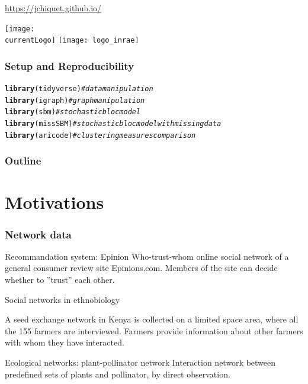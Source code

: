 \documentclass{beamer}\usepackage[]{graphicx}\usepackage[]{color}
\title{\currentCourse}
\subtitle{\huge\currentChapter\normalsize}
\institute{\currentInstitute}
\date{\currentDate}
\makeatletter
\newcommand{\hlcom}[1]{\textcolor[rgb]{0.678,0.584,0.686}{\textit{#1}}}%
\newcommand{\hlstd}[1]{\textcolor[rgb]{0.345,0.345,0.345}{#1}}%
\newcommand{\hlkwd}[1]{\textcolor[rgb]{0.737,0.353,0.396}{\textbf{#1}}}%
\newenvironment{kframe}{%
 \def\at@end@of@kframe{}%
 \ifinner\ifhmode%
  \def\at@end@of@kframe{\end{minipage}}%
  \begin{minipage}{\columnwidth}%
 \fi\fi%
 \def\FrameCommand##1{\hskip\@totalleftmargin \hskip-\fboxsep
 \colorbox{shadecolor}{##1}\hskip-\fboxsep
     \hskip-\linewidth \hskip-\@totalleftmargin \hskip\columnwidth}%
 \MakeFramed {\advance\hsize-\width
   \@totalleftmargin\z@ \linewidth\hsize
   \@setminipage}}%
 {\par\unskip\endMakeFramed%
 \at@end@of@kframe}
\newenvironment{knitrout}{}{} %
\def\currentLogo{../common_figs/logo_apt}
\newcommand{\dotitlepage}{%
  \begin{frame}
    \titlepage
    \vfill
    \begin{center}
        \scriptsize\url{https://jchiquet.github.io/}
    \end{center}
    \vfill
    \texttt{[image: \\currentLogo]}\hfill
    \texttt{[image: logo\_inrae]}
  \end{frame}
}
\makeatother
\begin{document}
\dotitlepage

\begin{frame}[fragile]
  \frametitle{Setup and Reproducibility}
  
\begin{knitrout}\scriptsize
{}\color{fgcolor}\begin{kframe}
\begin{alltt}
\hlkwd{library}\hlstd{(tidyverse)} \hlcom{# data manipulation}
\hlkwd{library}\hlstd{(igraph)}    \hlcom{# graph manipulation}
\hlkwd{library}\hlstd{(sbm)}       \hlcom{# stochastic bloc model}
\hlkwd{library}\hlstd{(missSBM)}   \hlcom{# stochastic bloc model with missing data}
\hlkwd{library}\hlstd{(aricode)}   \hlcom{# clustering measures comparison}
\end{alltt}
\end{kframe}
\end{knitrout}



\end{frame}

\begin{frame}
  \frametitle{Outline}
  \tableofcontents
\end{frame}

\section{Motivations}

\begin{frame}
  \frametitle{Network data}

  \begin{block}{Recommandation system: Epinion}
Who-trust-whom online social network of a general consumer review site Epinions.com. Members of the site can decide whether to ''trust'' each other. 

\end{block}

\begin{block}{Social networks in ethnobiology}

A seed exchange network in Kenya is collected on a limited space area, where all the 155 farmers are interviewed. Farmers provide information about other farmers with whom they have interacted.

\end{block}

\begin{block}{Ecological networks: plant-pollinator network}
Interaction network between predefined sets of plants and pollinator, by direct observation.
\end{block}

\end{frame}
\end{document}
